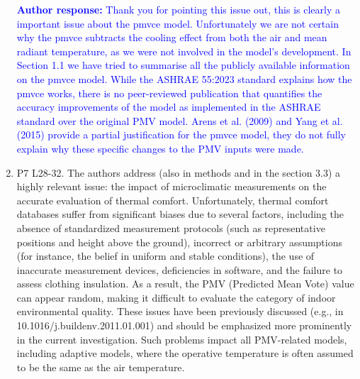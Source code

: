 \documentclass[a4paper, 10pt]{letter}
\newcommand{\response}[1]{\textcolor{blue}{\textbf{Author response:} #1}}
\begin{document}
\begin{letter}
\begin{enumerate}
            \response{
                Thank you for pointing this issue out, this is clearly a important issue about the \ac{pmvce} model.
                Unfortunately we are not certain why the \ac{pmvce} subtracts the cooling effect from both the air and mean radiant temperature, as we were not involved in the model's development.
                In Section 1.1 we have tried to summarise all the publicly available information on the \ac{pmvce} model.
                While the ASHRAE 55:2023 standard explains how the \ac{pmvce} works, there is no peer-reviewed publication that quantifies the accuracy improvements of the model as implemented in the ASHRAE standard over the original PMV model.
                Arens et al. (2009) and Yang et al. (2015) provide a partial justification for the \ac{pmvce} model, they do not fully explain why these specific changes to the PMV inputs were made.
            }

            \item P7 L28-32.
            The authors address (also in methods and in the section 3.3) a highly relevant issue: the impact of microclimatic measurements on the accurate evaluation of thermal comfort.
            Unfortunately, thermal comfort databases suffer from significant biases due to several factors, including the absence of standardized measurement protocols (such as representative positions and height above the ground), incorrect or arbitrary assumptions (for instance, the belief in uniform and stable conditions), the use of inaccurate measurement devices, deficiencies in software, and the failure to assess clothing insulation.
            As a result, the PMV (Predicted Mean Vote) value can appear random, making it difficult to evaluate the category of indoor environmental quality.
            These issues have been previously discussed (e.g., in 10.1016/j.buildenv.2011.01.001) and should be emphasized more prominently in the current investigation.
            Such problems impact all PMV-related models, including adaptive models, where the operative temperature is often assumed to be the same as the air temperature.


\end{enumerate}
\end{letter}
\end{document}
